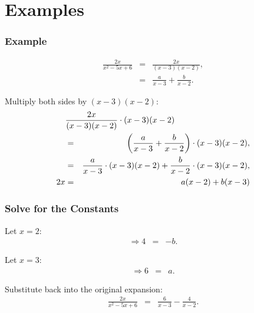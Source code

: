 \section{Examples}

\begin{frame}
  \frametitle{Example}

  \begin{eqnarray*}
    \frac{2x}{x^2-5x+6} & = & \frac{2x}{(x-3)(x-2)}, \\
      & = & \frac{a}{x-3} + \frac{b}{x-2}.
  \end{eqnarray*}

  Multiply both sides by $(x-3)(x-2)$:
  \begin{eqnarray*}
    \lefteqn{\frac{2x}{(x-3)(x-2)} \cdot (x-3)(x-2)  } \\
      & = & \lp \frac{a}{x-3} + \frac{b}{x-2} \rp \cdot (x-3)(x-2), \\
      & = &  \frac{a}{x-3} \cdot (x-3)(x-2) + \frac{b}{x-2} \cdot (x-3)(x-2), \\
      2x & = & a (x-2) + b(x-3)
  \end{eqnarray*}


\end{frame}


\begin{frame}
  \frametitle{Solve for the Constants}

  Let $x=2$:
  \begin{eqnarray*}
    \Rightarrow 4 & = & -b.
  \end{eqnarray*}

  Let $x=3$:
  \begin{eqnarray*}
    \Rightarrow 6 & = & a.
  \end{eqnarray*}

  Substitute back into the original expansion:
  \begin{eqnarray*}
    \frac{2x}{x^2-5x+6} & = & \frac{6}{x-3} - \frac{4}{x-2}.
  \end{eqnarray*}

\end{frame}


